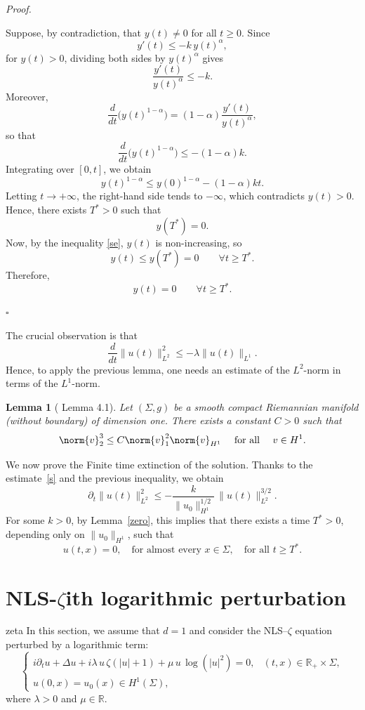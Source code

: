 \documentclass[10pt]{article}
\newtheorem{lemma}[theorem]{Lemma}
\renewenvironment{proof}[1][Proof]{%
  \noindent\textit{#1. }%
}{\hfill$\square$\vspace{4pt}}
\begin{document}
\begin{proof}
Suppose, by contradiction, that $y(t) \neq 0$ for all $t \ge 0$.
Since
\begin{equation}\label{se}
    y'(t) \le -k\, y(t)^{\alpha},
\end{equation}
for $y(t) > 0$, dividing both sides by $y(t)^\alpha$ gives
\[
\frac{y'(t)}{y(t)^\alpha} \le -k.
\]
Moreover,
\[
\frac{d}{dt} \bigl( y(t)^{1-\alpha} \bigr) 
= (1-\alpha) \frac{y'(t)}{y(t)^\alpha},
\]
so that
\[
\frac{d}{dt} \bigl( y(t)^{1-\alpha} \bigr) \le -(1-\alpha) k.
\]
Integrating over $[0,t]$, we obtain
\[
y(t)^{1-\alpha} \le y(0)^{1-\alpha} - (1-\alpha) k t.
\]
Letting $t \to +\infty$, the right-hand side tends to $-\infty$, which contradicts $y(t) > 0$.  
\\
Hence, there exists $T^* > 0$ such that
\[
y(T^*) = 0.
\]
Now, by the inequality \eqref{se}, $y(t)$ is non-increasing, so
\[
y(t) \le y(T^*) = 0 \qquad \forall t \ge T^*.
\]
Therefore,
\[
y(t) = 0 \qquad \forall t \ge T^*.
\]


\end{proof}

The crucial observation is that
\begin{equation}\label{s}
\frac{d}{dt}\|u(t)\|_{L^2}^2 \le -\lambda \|u(t)\|_{L^1}.
\end{equation}
Hence, to apply the previous lemma, one needs an estimate of the $L^2$-norm
in terms of the $L^1$-norm.
\begin{lemma}[\cite{3} Lemma 4.1]
    Let $(\Sigma,g)$ be a smooth compact Riemannian manifold (without boundary) of dimension one. 
There exists a constant $C>0$ such that $$\norm{v}_2^3\leq C \norm{v}_1^2\norm{v}_{H^1} \quad \text{ for all } \quad v\in H^1.$$
\end{lemma}
We now prove the Finite time extinction of the solution. 
Thanks to the estimate~\eqref{s} and the previous inequality, we obtain
\[
\partial_t \|u(t)\|_{L^2}^2
\le
-\frac{k}{\|u_0\|_{H^1}^{1/2}}\,\|u(t)\|_{L^2}^{3/2}.
\]
For some $k>0$, by Lemma~\ref{zero}, this implies that there exists a time
$T^*>0$, depending only on $\|u_0\|_{H^1}$, such that
\[
u(t, x)=0,\quad \text{for almost every } x \in \Sigma, \quad \text{for all } t \ge T^*.
\]
\section{NLS-\texorpdfstring{$\zeta$} with logarithmic perturbation}{zeta}
In this section, we assume that $ d = 1 $ and consider the NLS--$\zeta$ equation perturbed by a logarithmic term:
\begin{equation}\tag{logNLS-$\zeta$}
\begin{cases}
i \partial_t u + \Delta u
+ i \lambda\, u\, \zeta(|u| + 1)
+ \mu\, u\, \log(|u|^2) = 0,
& (t,x) \in \mathbb{R}_+ \times \Sigma, \\[0.3em]
u(0,x) = u_0(x) \in H^1(\Sigma),
\end{cases}
\end{equation}
where $ \lambda > 0 $ and $ \mu \in \mathbb{R} $.
\end{document}
